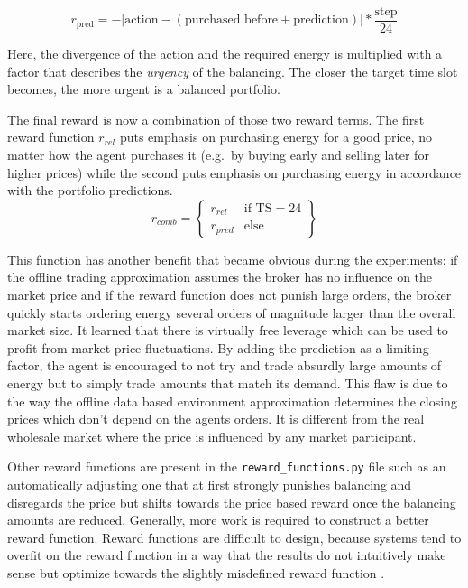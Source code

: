 \begin{equation}
    r_{\text{pred}} = - | \text{action} - (\text{purchased before} + \text{prediction}) | * \frac{\text{step}}{24}
\end{equation}

Here, the divergence of the action and the required energy is multiplied with a factor that describes the \emph{urgency}
of the balancing. The closer the target time slot becomes, the more urgent is a balanced portfolio.

The final reward is now a combination of those two reward terms. The first reward function $r_{rel}$ puts emphasis on purchasing
energy for a good price, no matter how the agent purchases it (e.g.\ by buying early and selling later for higher
prices) while the second puts emphasis on purchasing energy in accordance with the portfolio predictions.
\begin{equation}
    r_{comb} = \left\{
        \begin{array}{lr}
            r_{rel} & \text{if TS} = 24 \\
            r_{pred} & \text{else}
        \end{array}
    \right\}
\end{equation}

This function has another benefit that became obvious during the experiments: if the offline trading approximation
assumes the broker has no influence on the market price and if the reward function does not punish large orders, the
broker quickly starts ordering energy several orders of magnitude larger than the overall market size. It learned that
there is virtually free leverage which can be used to profit from market price fluctuations. By adding the
prediction as a limiting factor, the agent is encouraged to not try and trade absurdly large amounts of energy but to
simply trade amounts that match its demand. This flaw is due to the way the offline data based environment approximation
determines the closing prices which don't depend on the agents orders. It is different from the real wholesale market
where the price is influenced by any market participant.

Other reward functions are present in the \texttt{reward\_functions.py} file such as an automatically adjusting one that
at first strongly punishes balancing and disregards the price but shifts towards the price based reward once the
balancing amounts are reduced. Generally, more work is required to construct a better reward function.
Reward functions are difficult to design, because systems tend to overfit on the reward function in a way that the
results do not intuitively make sense but optimize towards the slightly misdefined reward function
\cite[]{amodei2016concrete}.

